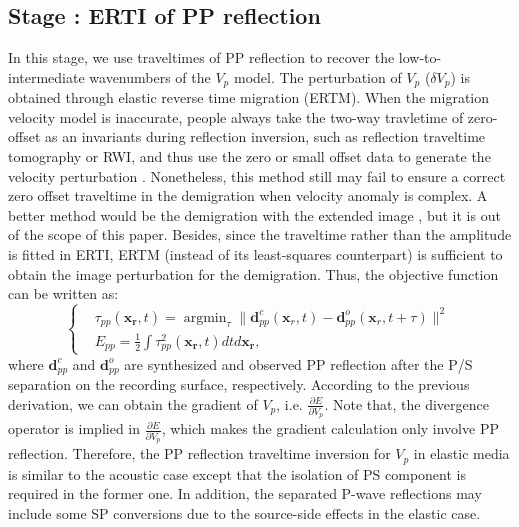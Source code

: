 \documentclass[extra,mreferee]{gji}
\newcommand{\Rome}[1]{{\bf\uppercase\expandafter{\romannumeral #1\relax}}}
\begin{document}
\subsection{Stage \Rome{1}: ERTI of PP reflection}
In this stage, we use traveltimes of PP reflection to recover the low-to-intermediate wavenumbers of
the $V_p$ model. 
The perturbation of $V_p$ ($\delta V_p$) is obtained through elastic reverse time migration (ERTM). 
When the migration velocity model is inaccurate, 
people always take
the two-way travletime of zero-offset as an invariants during reflection inversion, such as reflection traveltime tomography or RWI,
and thus use the zero or small offset data to generate the velocity perturbation \cite[]{Zhou2015}. 
Nonetheless, this method still may fail to ensure a correct zero offset traveltime in the
demigration when velocity anomaly is complex. A better method would be the demigration with the extended
image \cite[]{Weibull2014, Hou2015, Qiang2017}, but it is out of the scope of this paper.
Besides, since the traveltime rather than the amplitude is fitted in ERTI, 
ERTM (instead of its least-squares counterpart) is sufficient to obtain the image perturbation for
the demigration.
Thus, the objective function can be written as:
\begin{equation}
	\left\{
		\begin{aligned}
			&\tau_{pp}(\mathbf{x_r},t)=\mathop{\arg\min}_{\tau}
			\parallel\mathbf{d}^{c}_{pp}(\mathbf{x}_r,t)-\mathbf{d}^{o}_{pp}(\mathbf{x}_r,t+\tau)\parallel^2\\
			&E_{pp}=\frac{1}{2}\int\tau^2_{pp}(\mathbf{x_r},t)dtd\mathbf{x_r},
		\end{aligned}
	\right.
    \label{eq:ObjectivefunctionPP} 
\end{equation}
where $\mathbf{d}^{c}_{pp}$ and $\mathbf{d}^{o}_{pp}$ are synthesized and observed PP reflection after the P/S
separation on the recording surface, respectively. According to the previous derivation, we can
obtain the gradient of  $V_p$, i.e. $\frac{\partial E}{\partial
V_p}$.
Note that, 
the divergence operator is implied in $\frac{\partial
E}{\partial V_p}$, which makes the gradient calculation only involve PP reflection.
Therefore, the PP reflection traveltime inversion for $V_p$ in elastic media is similar to the acoustic case
except that the isolation of PS component is required in the former one. In addition, the separated
P-wave reflections may include some SP conversions due to the source-side effects in the elastic
case. %
\end{document}
